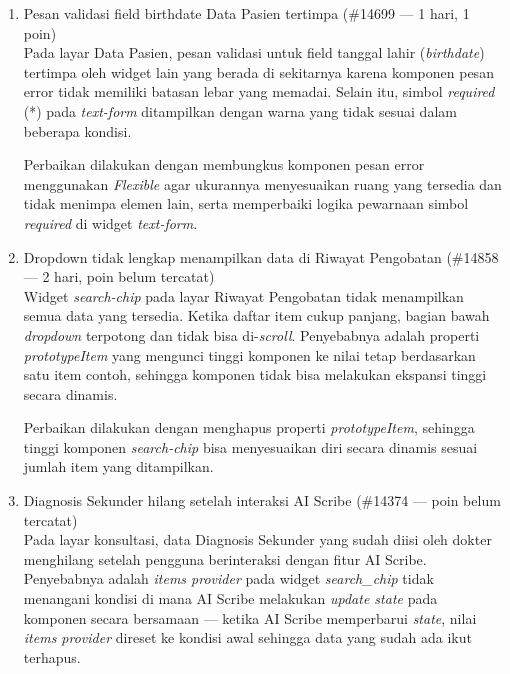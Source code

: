 \begin{enumerate}
          Perbaikan dilakukan dengan menonaktifkan opsi \textit{group by} secara otomatis
          ketika \textit{ListBased} berada dalam mode tampilan \textit{card-vertical},
          sehingga pengguna tidak dapat mengaktifkan kombinasi yang belum didukung.

    \item Pesan validasi field birthdate Data Pasien tertimpa (\#14699 --- 1 hari, 1
          poin) \\ Pada layar Data Pasien, pesan validasi untuk field tanggal lahir
          (\textit{birthdate}) tertimpa oleh widget lain yang berada di sekitarnya karena
          komponen pesan error tidak memiliki batasan lebar yang memadai. Selain itu,
          simbol \textit{required} (*) pada \textit{text-form} ditampilkan dengan warna
          yang tidak sesuai dalam beberapa kondisi.

          Perbaikan dilakukan dengan membungkus komponen pesan error menggunakan
          \textit{Flexible} agar ukurannya menyesuaikan ruang yang tersedia dan tidak
          menimpa elemen lain, serta memperbaiki logika pewarnaan simbol
          \textit{required} di widget \textit{text-form}.

    \item Dropdown tidak lengkap menampilkan data di Riwayat Pengobatan (\#14858 --- 2
          hari, poin belum tercatat) \\ Widget \textit{search-chip} pada layar Riwayat
          Pengobatan tidak menampilkan semua data yang tersedia. Ketika daftar item cukup
          panjang, bagian bawah \textit{dropdown} terpotong dan tidak bisa
          di-\textit{scroll}. Penyebabnya adalah properti \textit{prototypeItem} yang
          mengunci tinggi komponen ke nilai tetap berdasarkan satu item contoh, sehingga
          komponen tidak bisa melakukan ekspansi tinggi secara dinamis.

          Perbaikan dilakukan dengan menghapus properti \textit{prototypeItem}, sehingga
          tinggi komponen \textit{search-chip} bisa menyesuaikan diri secara dinamis
          sesuai jumlah item yang ditampilkan.

    \item Diagnosis Sekunder hilang setelah interaksi AI Scribe (\#14374 --- poin belum
          tercatat) \\ Pada layar konsultasi, data Diagnosis Sekunder yang sudah diisi
          oleh dokter menghilang setelah pengguna berinteraksi dengan fitur AI Scribe.
          Penyebabnya adalah \textit{items provider} pada widget \textit{search\_chip}
          tidak menangani kondisi di mana AI Scribe melakukan \textit{update state} pada
          komponen secara bersamaan --- ketika AI Scribe memperbarui \textit{state},
          nilai \textit{items provider} direset ke kondisi awal sehingga data yang sudah
          ada ikut terhapus.


\end{enumerate}
